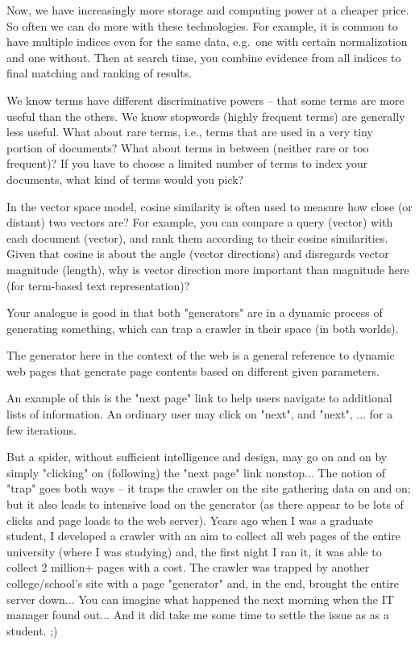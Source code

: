 \documentclass[
  letterpaper,
]{scrbook}
\begin{document}
Now, we have increasingly more storage and computing power at a cheaper
price. So often we can do more with these technologies. For example, it
is common to have multiple indices even for the same data, e.g.~one with
certain normalization and one without. Then at search time, you combine
evidence from all indices to final matching and ranking of results.

We know terms have different discriminative powers -- that some terms
are more useful than the others. We know stopwords (highly frequent
terms) are generally less useful. What about rare terms, i.e., terms
that are used in a very tiny portion of documents? What about terms in
between (neither rare or too frequent)? If you have to choose a limited
number of terms to index your documents, what kind of terms would you
pick?

In the vector space model, cosine similarity is often used to measure
how close (or distant) two vectors are? For example, you can compare a
query (vector) with each document (vector), and rank them according to
their cosine similarities. Given that cosine is about the angle (vector
directions) and disregards vector magnitude (length), why is vector
direction more important than magnitude here (for term-based text
representation)?

Your analogue is good in that both "generators" are in a dynamic process
of generating something, which can trap a crawler in their space (in
both worlds).

The generator here in the context of the web is a general reference to
dynamic web pages that generate page contents based on different given
parameters.

An example of this is ﻿﻿﻿﻿﻿﻿﻿﻿﻿﻿﻿﻿﻿﻿﻿﻿﻿﻿﻿the "next page" link to help users navigate to
additional lists of information. An ordinary user may click on "next",
and "next", ... for a few iterations.

But a spider, without sufficient intelligence and design, may go on and
on by simply "clicking" on (following) the "next page" link nonstop...
The notion of "trap" goes both ways -- it traps the crawler on the site
gathering data on and on; but it also leads to intensive load on the
generator (as there appear to be lots of clicks and page loads to the
web server). Years ago when I was a graduate student, I developed a
crawler with an aim to collect all web pages of the entire university
(where I was studying) and, the first night I ran it, it was able to
collect 2 million+ pages with a cost. The crawler was trapped by another
college/school's site with a page "generator" and, in the end, brought
the entire server down... You can imagine what happened the next morning
when the IT manager found out... And it did take me some time to settle
the issue as as a student. ;)
\end{document}

